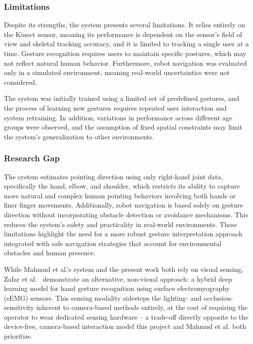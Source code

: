 \subsubsection{Limitations}

Despite its strengths, the system presents several limitations. It relies entirely on the Kinect sensor, meaning its performance is dependent on the sensor’s field of view and skeletal tracking accuracy, and it is limited to tracking a single user at a time. Gesture recognition requires users to maintain specific postures, which may not reflect natural human behavior. Furthermore, robot navigation was evaluated only in a simulated environment, meaning real-world uncertainties were not considered.

The system was initially trained using a limited set of predefined gestures, and the process of learning new gestures requires repeated user interaction and system retraining. In addition, variations in performance across different age groups were observed, and the assumption of fixed spatial constraints may limit the system’s generalization to other environments.

\subsubsection{Research Gap}

The system estimates pointing direction using only right-hand joint data, specifically the hand, elbow, and shoulder, which restricts its ability to capture more natural and complex human pointing behaviors involving both hands or finer finger movements. Additionally, robot navigation is based solely on gesture direction without incorporating obstacle detection or avoidance mechanisms. This reduces the system’s safety and practicality in real-world environments. These limitations highlight the need for a more robust gesture interpretation approach integrated with safe navigation strategies that account for environmental obstacles and human presence.

While Mahmud et al.'s system and the present work both rely on visual sensing,
Zafar et al.~\cite{zafar2023} demonstrate an alternative, non-visual approach: a
hybrid deep learning model for hand gesture recognition using surface
electromyography (sEMG) sensors. This sensing modality sidesteps the lighting- and
occlusion-sensitivity inherent to camera-based methods entirely, at the cost of
requiring the operator to wear dedicated sensing hardware -- a trade-off directly
opposite to the device-free, camera-based interaction model this project and Mahmud
et al. both prioritize.

